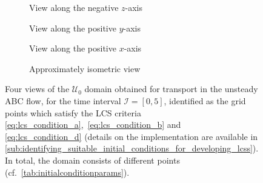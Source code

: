 \begin{figure}[htpb]
    \centering
    \hspace*{\fill}
    \begin{subfigure}[b]{0.43\textwidth}
        \centering
        \caption[]{{\small View along the negative $z$-axis}}
        \label{fig:unsteady_abd_z}
    \end{subfigure}\hfill%
    \begin{subfigure}[b]{0.43\textwidth}
        \centering
        \caption[]{{\small View along the positive $y$-axis}}
        \label{fig:unsteady_abd_y}
    \end{subfigure}%
    \hspace*{\fill}

    \hspace*{\fill}
    \begin{subfigure}[b]{0.43\textwidth}
        \centering
        \caption[]{{\small View along the positive $x$-axis}}
        \label{fig:unsteady_abd_x}
    \end{subfigure}\hfill%
    \begin{subfigure}[b]{0.43\textwidth}
        \centering
        \caption[]{{\small Approximately isometric view}}
        \label{fig:unsteady_abd_isometric}
    \end{subfigure}%
    \hspace*{\fill}
    \caption[Four views of the $\mathcal{U}_{0}$ domain obtained for transport
    in the unsteady ABC flow]
    {
        Four views of the $\mathcal{U}_{0}$ domain obtained for transport in the
        unsteady ABC flow, for the time interval $\mathcal{I}=[0,5]$,
        identified as the grid points which satisfy the LCS criteria
        \eqref{eq:lcs_condition_a},~\eqref{eq:lcs_condition_b} and~
        \eqref{eq:lcs_condition_d} (details on the implementation are available
        in
        \cref{sub:identifying_suitable_initial_conditions_for_developing_lcss}).
        In total, the domain consists of  different points
        (cf.\ \cref{tab:initialconditionparams}).
}
    \label{fig:unsteady_abd}
\end{figure}

